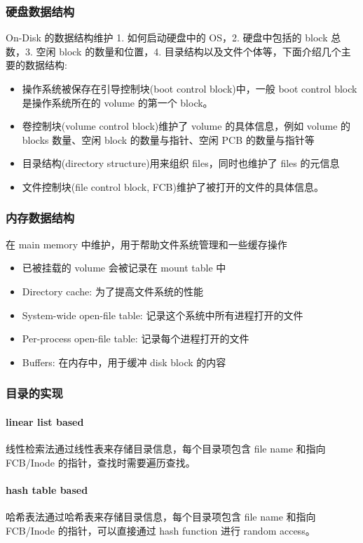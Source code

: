 \subsubsection{硬盘数据结构}
On-Disk 的数据结构维护 1. 如何启动硬盘中的 OS，2. 硬盘中包括的 block 总数，3. 空闲 block 的数量和位置，4. 目录结构以及文件个体等，下面介绍几个主要的数据结构:
\begin{itemize}
    \item 操作系统被保存在引导控制块(boot control block)中，一般 boot control block 是操作系统所在的 volume 的第一个 block。
    \item 卷控制块(volume control block)维护了 volume 的具体信息，例如 volume 的 blocks 数量、空闲 block 的数量与指针、空闲 PCB 的数量与指针等
    \item 目录结构(directory structure)用来组织 files，同时也维护了 files 的元信息
    \item 文件控制块(file control block, FCB)维护了被打开的文件的具体信息。
\end{itemize}

\subsubsection{内存数据结构}
在 main memory 中维护，用于帮助文件系统管理和一些缓存操作
\begin{itemize}
    \item 已被挂载的 volume 会被记录在 mount table 中
    \item Directory cache: 为了提高文件系统的性能
    \item System-wide open-file table: 记录这个系统中所有进程打开的文件
    \item Per-process open-file table: 记录每个进程打开的文件
    \item Buffers: 在内存中，用于缓冲 disk block 的内容
\end{itemize}

\subsubsection{目录的实现}
\paragraph{linear list based}线性检索法通过线性表来存储目录信息，每个目录项包含 file name 和指向 FCB/Inode 的指针，查找时需要遍历查找。

\paragraph{hash table based}哈希表法通过哈希表来存储目录信息，每个目录项包含 file name 和指向 FCB/Inode 的指针，可以直接通过 hash function 进行 random access。
